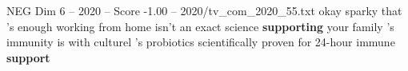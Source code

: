 \begin{textsample}{NEG Dim 6 – 2020 – Score -1.00 – 2020/tv\_com\_2020\_55.txt}  \label{ex:f6_neg_058}
okay sparky that 's enough working from home isn't an exact science \textbf{supporting} your family 's immunity is with culturel 's probiotics scientifically proven for 24-hour immune \textbf{support}

\end{textsample}
